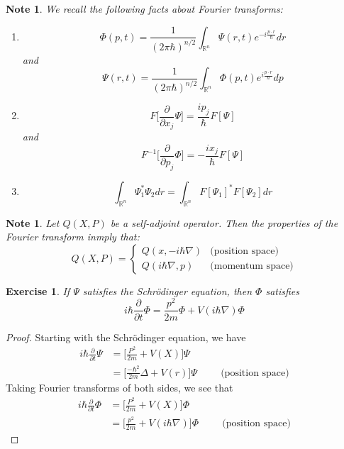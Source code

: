 \documentclass[12pt]{amsart}
\newtheorem{note}[thm]{Note}
\newtheorem{ex}[thm]{Exercise}
\newcommand{\Del}{\Delta}
\newcommand{\R}{\mathbb{R}}
\newcommand{\p}[1]{\frac{\partial}{\partial{#1}}}
\begin{document}
\begin{note}
We recall the following facts about Fourier transforms:
\begin{enumerate}
\item $$\Phi(p,t) = \frac{1}{(2 \pi \hbar)^{n/2}} \int_{\R ^n}\Psi(r,t)e^{-i \frac{p \cdot r}{\hbar} }dr $$ and $$\Psi(r,t) = \frac{1}{(2 \pi \hbar)^{n/2}} \int_{\R ^n}\Phi(p,t)e^{i \frac{p \cdot r}{\hbar} }dp $$

\item $$F\bigg[\p{x_j} \Psi \bigg] = \frac{i p_j}{\hbar}F[\Psi]$$
and $$F^{-1}\bigg[\p{p_j} \Phi \bigg] = -\frac{i x_j}{\hbar}F[\Psi]$$

\item $$\int_{\R^n} \Psi_1^* \Psi_2 dr = \int_{\R^n} F[\Psi_1]^* F[\Psi_2]dr$$
\end{enumerate}
\end{note}

\begin{note}
Let $Q(X,P)$ be a self-adjoint operator. Then the properties of the Fourier transform inmply that:
\[
Q(X,P)=
\begin{cases}
Q(x, -i\hbar \nabla) & \text{(position space)}\\
Q(i\hbar \nabla, p) & \text{(momentum space)}
\end{cases}
\]
\end{note}

\begin{ex}
If $\Psi$ satisfies the Schr\"{o}dinger equation, then $\Phi$ satisfies $$i\hbar \p{t}\Phi = \frac{p^2}{2m}\Phi + V(i \hbar \nabla)\Phi$$
\end{ex}

\begin{proof}
Starting with the Schr\"{o}dinger equation, we have 
\begin{align*}
i\hbar \p{t} \Psi 
&= \bigg[\frac{P^2}{2m} + V(X)\bigg] \Psi\\
&= \bigg[\frac{-\hbar^2}{2m}\Del + V(r)\bigg] \Psi \hspace{1cm} \text{(position space)}
\end{align*} 
Taking Fourier transforms of both sides, we see that 
\begin{align*}
i\hbar \p{t} \Phi 
&= \bigg[\frac{P^2}{2m} + V(X)\bigg] \Phi\\
&= \bigg[\frac{p^2}{2m} + V(i \hbar \nabla)\bigg] \Phi \hspace{1cm} \text{(position space)}
\end{align*} 
\end{proof}
\end{document}
